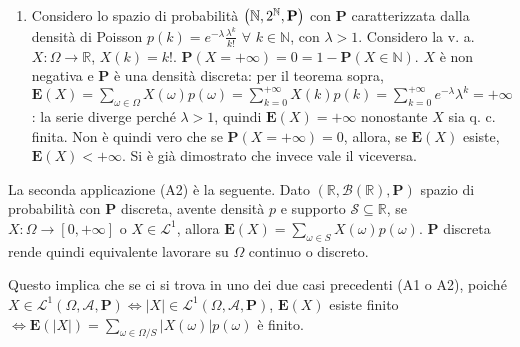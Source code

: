 \documentclass{article}
\begin{document}
\begin{enumerate}
\item Considero lo spazio di probabilit\`{a} $\left( 
\mathbb{N}
,2^{%
\mathbb{N}
},\mathbf{P}\right) $ con $\mathbf{P}$ caratterizzata dalla densit\`{a} di
Poisson $p\left( k\right) =e^{-\lambda }\frac{\lambda ^{k}}{k!}$ $\forall $ $%
k\in 
\mathbb{N}
$, con $\lambda >1$. Considero la v. a. $X:\Omega \rightarrow 
\mathbb{R}
$, $X\left( k\right) =k!$. $\mathbf{P}\left( X=+\infty \right) =0=1-\mathbf{P%
}\left( X\in 
\mathbb{N}
\right) $. $X$ \`{e} non negativa e $\mathbf{P}$ \`{e} una densit\`{a}
discreta: per il teorema sopra, $\mathbf{E}\left( X\right) =\sum_{\omega \in
\Omega }X\left( \omega \right) p\left( \omega \right) =\sum_{k=0}^{+\infty
}X\left( k\right) p\left( k\right) =\sum_{k=0}^{+\infty }e^{-\lambda
}\lambda ^{k}=+\infty $: la serie diverge perch\'{e} $\lambda >1$, quindi $%
\mathbf{E}\left( X\right) =+\infty $ nonostante $X$ sia q. c. finita. Non 
\`{e} quindi vero che se $\mathbf{P}\left( X=+\infty \right) =0$, allora, se 
$\mathbf{E}\left( X\right) $ esiste, $\mathbf{E}\left( X\right) <+\infty $.
Si \`{e} gi\`{a} dimostrato che invece vale il viceversa.
\end{enumerate}

La seconda applicazione (A2) \`{e} la seguente. Dato $\left( 
\mathbb{R}
,\mathcal{B}\left( 
\mathbb{R}
\right) ,\mathbf{P}\right) $ spazio di probabilit\`{a} con $\mathbf{P}$
discreta, avente densit\`{a} $p$ e supporto $\mathcal{S}\subseteq 
\mathbb{R}
$, se $X:\Omega \rightarrow \left[ 0,+\infty \right] $ o $X\in \mathcal{L}%
^{1}$, allora $\mathbf{E}\left( X\right) =\sum_{\omega \in S}X\left( \omega
\right) p\left( \omega \right) $. $\mathbf{P}$ discreta rende quindi
equivalente lavorare su $\Omega $ continuo o discreto.

Questo implica che se ci si trova in uno dei due casi precedenti (A1 o A2),
poich\'{e} $X\in \mathcal{L}^{1}\left( \Omega ,\mathcal{A},\mathbf{P}\right)
\Longleftrightarrow \left\vert X\right\vert \in \mathcal{L}^{1}\left( \Omega
,\mathcal{A},\mathbf{P}\right) $, $\mathbf{E}\left( X\right) $ esiste finito 
$\Longleftrightarrow \mathbf{E}\left( \left\vert X\right\vert \right)
=\sum_{\omega \in \Omega /S}\left\vert X\left( \omega \right) \right\vert
p\left( \omega \right) $ \`{e} finito.
\end{document}

